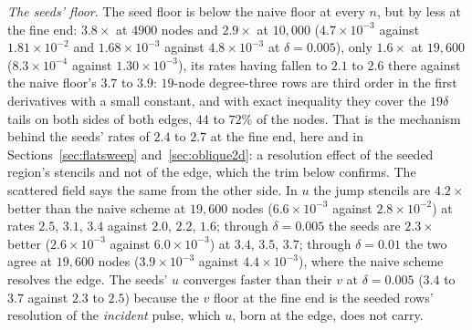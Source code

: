 \documentclass[11pt]{amsart}
\theoremstyle{definition}
\theoremstyle{remark}
\newcommand{\para}[1]{\par\smallskip\noindent\textit{#1}.\enspace}
\newcommand{\sci}[2]{\ensuremath{#1 \times 10^{#2}}}
\newcommand{\tablesetup}{\footnotesize\setlength{\tabcolsep}{2.5pt}%
  \renewcommand{\sci}[2]{\ensuremath{##1{\times}10^{##2}}}}
\begin{document}
\para{The seeds' floor}
The seed floor is below the naive floor at every $n$, but by less at the
fine end: $3.8\times$ at $4900$ nodes and $2.9\times$ at $10{,}000$
($4.7 \times 10^{-3}$ against $1.81 \times 10^{-2}$ and
$1.68 \times 10^{-3}$ against $4.8 \times 10^{-3}$ at $\delta = 0.005$),
only $1.6\times$ at $19{,}600$ ($8.3 \times 10^{-4}$ against
$1.30 \times 10^{-3}$), its rates having fallen to $2.1$ to $2.6$ there
against the naive floor's $3.7$ to $3.9$:
$19$-node degree-three rows are third order in the first derivatives
with a small constant, and with exact inequality they cover the
$19\delta$ tails on both sides of both edges, $44$ to $72\%$ of the
nodes. That is the mechanism behind the seeds' rates of $2.4$ to $2.7$
at the fine end, here and in Sections~\ref{sec:flatsweep}
and~\ref{sec:oblique2d}: a resolution effect of the seeded region's
stencils and not of the edge, which the trim below confirms. The
scattered field says the same from the other side. In $u$ the jump
stencils are $4.2\times$ better than the naive scheme at $19{,}600$
nodes ($6.6 \times 10^{-3}$ against $2.8 \times 10^{-2}$) at rates $2.5$,
$3.1$, $3.4$ against $2.0$, $2.2$, $1.6$; through $\delta = 0.005$ the
seeds are $2.3\times$ better ($2.6 \times 10^{-3}$ against
$6.0 \times 10^{-3}$) at $3.4$, $3.5$, $3.7$; through $\delta = 0.01$ the
two agree at $19{,}600$ nodes ($3.9 \times 10^{-3}$ against
$4.4 \times 10^{-3}$), where the naive scheme resolves the edge. The
seeds' $u$ converges faster than their $v$ at $\delta = 0.005$ ($3.4$ to
$3.7$ against $2.3$ to $2.5$) because the $v$ floor at the fine end is
the seeded rows' resolution of the \emph{incident} pulse, which $u$,
born at the edge, does not carry.

\begin{table}
  \caption{Curved edges (amplitude $0.02$) at normal incidence: relative
  $\ell^2$ error in $v$ at $t = 1$ and rates, for the naive scheme, the
  seeds marched along the true normal (the interface-aware stencils at
  $\delta = 0$) and the seed floor, with the resolution floor.
  $h / \delta$ runs from $8$ to $2.9$ at $\delta = 0.0025$, from $4$ to
  $1.4$ at $0.005$ and from $2$ to $0.71$ at $0.01$.}
  \label{tab:curved2d_v}
  \centering
  \tablesetup
  
\end{table}

\begin{table}
  \caption{Curved edges: relative $\ell^2$ error in $u$ at $t = 1$ and
  rates, for the runs of Table~\ref{tab:curved2d_v}. The curved edges
  make $u$ out of the incident pulse, so its relative error measures the
  scattered field; the floors' pulse has no $u$, and their rows are the
  largest spurious $|u|$.}
  \label{tab:curved2d_u}
  \centering
  \tablesetup
  
\end{table}
\end{document}
